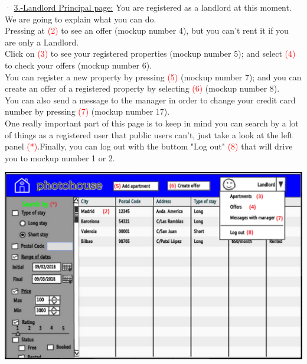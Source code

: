\documentclass[12pt]{article}
\begin{document}
{· \underline{3.-Landlord Principal page:} You are registered as a landlord at this moment. We are going to explain what you can do.\\ Pressing at \textcolor{red}{(2)} to see an offer (mockup number 4), but you can't rent it if you are only a Landlord.\\ Click on \textcolor{red}{(3)} to see your registered properties (mockup number 5); and select \textcolor{red}{(4)} to check your offers (mockup number 6).\\ You can register a new property by pressing \textcolor{red}{(5)} (mockup number 7); and you can create an offer of a registered property by selecting \textcolor{red}{(6)} (mockup number 8).\\ You can also send a message to the manager in order to change your credit card number by pressing \textcolor{red}{(7)} (mockup number 17).\\ One really important part of this page is to keep in mind you can search by a lot of things as a registered user that public users can't, just take a look at the left panel \textcolor{red}{(*)}.Finally, you can log out with the buttom "Log out" \textcolor{red}{(8)} that will drive you to mockup number 1 or 2.
\begin{center}
	\includegraphics[scale=.7]{landlord.PNG}
\end{center}


}
\end{document}
